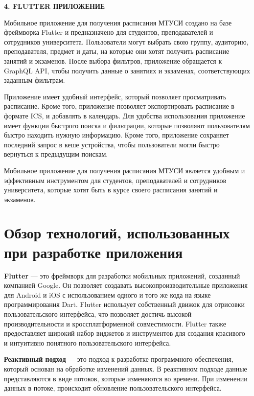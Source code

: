 

\newpage
\begin{center}
    \textbf{\large 4. FLUTTER ПРИЛОЖЕНИЕ}
\end{center}

Мобильное приложение для получения расписания МТУСИ создано на базе фреймворка Flutter 
и предназначено для студентов, преподавателей и сотрудников университета. 
Пользователи могут выбрать свою группу, аудиторию, преподавателя, предмет и даты, 
на которые они хотят получить расписание занятий и экзаменов. 
После выбора фильтров, приложение обращается к GraphQL API, чтобы получить данные о занятиях и экзаменах, 
соответствующих заданным фильтрам.

Приложение имеет удобный интерфейс, который позволяет просматривать расписание. 
Кроме того, приложение позволяет экспортировать расписание в формате ICS, и добавлять в календарь.
Для удобства использования приложение имеет функции быстрого поиска и фильтрации,
которые позволяют пользователям быстро находить нужную информацию.
Кроме того, приложение сохраняет последний запрос в кеше устройства,
чтобы пользователи могли быстро вернуться к предыдущим поискам.

Мобильное приложение для получения расписания МТУСИ является удобным и
эффективным инструментом для студентов, преподавателей и сотрудников университета,
которые хотят быть в курсе своего расписания занятий и экзаменов.

\section{Обзор технологий, использованных при разработке приложения}

\textbf{Flutter} --- это фреймворк для разработки мобильных приложений,
созданный компанией Google.
Он позволяет создавать высокопроизводительные приложения для Android и iOS
с использованием одного и того же кода на языке программирования Dart.
Flutter использует собственный движок для отрисовки пользовательского интерфейса,
что позволяет достичь высокой производительности и кроссплатформенной совместимости.
Flutter также предоставляет широкий набор виджетов и инструментов для создания красивого
и интуитивно понятного пользовательского интерфейса.

\textbf{Реактивный подход} --- это подход к разработке программного обеспечения,
который основан на обработке изменений данных. 
В реактивном подходе данные представляются в виде потоков,
которые изменяются во времени.
При изменении данных в потоке, происходит обновление пользовательского интерфейса.

